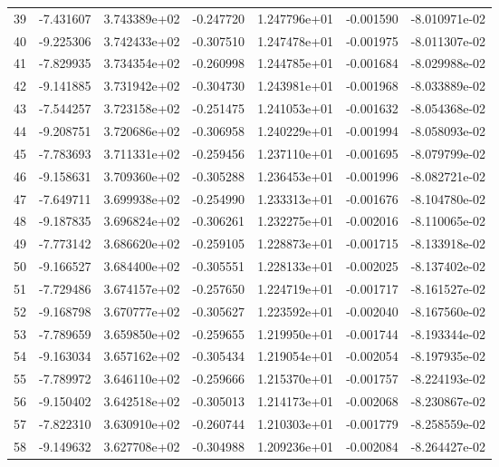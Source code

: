 \begin{tabular}{rrrrrrr}
  39 &  -7.431607 &  3.743389e+02 & -0.247720 &  1.247796e+01 &   -0.001590 & -8.010971e-02 \\
  40 &  -9.225306 &  3.742433e+02 & -0.307510 &  1.247478e+01 &   -0.001975 & -8.011307e-02 \\
  41 &  -7.829935 &  3.734354e+02 & -0.260998 &  1.244785e+01 &   -0.001684 & -8.029988e-02 \\
  42 &  -9.141885 &  3.731942e+02 & -0.304730 &  1.243981e+01 &   -0.001968 & -8.033889e-02 \\
  43 &  -7.544257 &  3.723158e+02 & -0.251475 &  1.241053e+01 &   -0.001632 & -8.054368e-02 \\
  44 &  -9.208751 &  3.720686e+02 & -0.306958 &  1.240229e+01 &   -0.001994 & -8.058093e-02 \\
  45 &  -7.783693 &  3.711331e+02 & -0.259456 &  1.237110e+01 &   -0.001695 & -8.079799e-02 \\
  46 &  -9.158631 &  3.709360e+02 & -0.305288 &  1.236453e+01 &   -0.001996 & -8.082721e-02 \\
  47 &  -7.649711 &  3.699938e+02 & -0.254990 &  1.233313e+01 &   -0.001676 & -8.104780e-02 \\
  48 &  -9.187835 &  3.696824e+02 & -0.306261 &  1.232275e+01 &   -0.002016 & -8.110065e-02 \\
  49 &  -7.773142 &  3.686620e+02 & -0.259105 &  1.228873e+01 &   -0.001715 & -8.133918e-02 \\
  50 &  -9.166527 &  3.684400e+02 & -0.305551 &  1.228133e+01 &   -0.002025 & -8.137402e-02 \\
  51 &  -7.729486 &  3.674157e+02 & -0.257650 &  1.224719e+01 &   -0.001717 & -8.161527e-02 \\
  52 &  -9.168798 &  3.670777e+02 & -0.305627 &  1.223592e+01 &   -0.002040 & -8.167560e-02 \\
  53 &  -7.789659 &  3.659850e+02 & -0.259655 &  1.219950e+01 &   -0.001744 & -8.193344e-02 \\
  54 &  -9.163034 &  3.657162e+02 & -0.305434 &  1.219054e+01 &   -0.002054 & -8.197935e-02 \\
  55 &  -7.789972 &  3.646110e+02 & -0.259666 &  1.215370e+01 &   -0.001757 & -8.224193e-02 \\
  56 &  -9.150402 &  3.642518e+02 & -0.305013 &  1.214173e+01 &   -0.002068 & -8.230867e-02 \\
  57 &  -7.822310 &  3.630910e+02 & -0.260744 &  1.210303e+01 &   -0.001779 & -8.258559e-02 \\
  58 &  -9.149632 &  3.627708e+02 & -0.304988 &  1.209236e+01 &   -0.002084 & -8.264427e-02 \\

\end{tabular}

